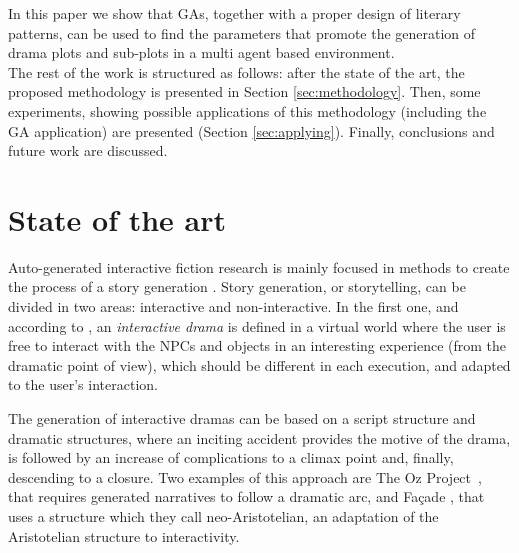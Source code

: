 \documentclass{sig-alternate}
\begin{document}

In this paper we show that GAs, together with a proper design of
literary patterns, can be used to find the parameters that promote the
generation of drama plots and sub-plots in a multi agent based
environment.\\


The rest of the work is structured as follows: after the state of the art, the proposed methodology is presented in Section \ref{sec:methodology}. Then, some experiments, showing possible applications of this methodology (including the GA application) are presented (Section \ref{sec:applying}). Finally, conclusions and future work are discussed.

%
%


\section{State of the art}
\label{sec:soa}


Auto-generated interactive fiction research is mainly focused in
methods to create the process of a story generation
\cite{nairat2011character}. Story generation, or storytelling, can be divided in two areas: interactive and non-interactive. In the first one, and
according to \cite{ReviewArinbjarnar09}, an {\em interactive drama} is
defined in a virtual world where the user is free to interact with
the NPCs and objects in an interesting experience (from the dramatic point of view), which should be different in each execution, and adapted to the user's interaction.

The generation of interactive dramas can be based on a script
structure \cite{ArchitectureYoung04} and dramatic structures, where an inciting accident provides the motive of the drama, is followed by an increase of complications to a climax point and, finally, descending to a closure. Two examples of this approach are The Oz Project~\cite{ozproject}, that requires generated narratives to follow a dramatic arc, and Fa\c{c}ade \cite{facade}, that uses a structure
which they call neo-Aristotelian, an adaptation of the Aristotelian
structure to interactivity.
\end{document}
